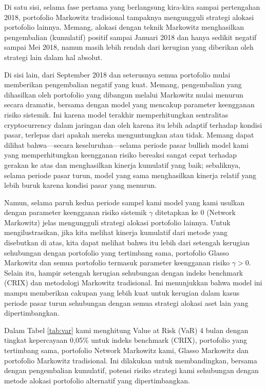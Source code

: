 \documentclass[12pt,a4paper]{article}
\begin{document}
Di satu sisi, selama fase pertama yang berlangsung kira-kira sampai pertengahan 2018, portofolio Markowitz tradisional tampaknya mengungguli strategi alokasi portofolio lainnya. Memang, alokasi dengan teknik Markowitz menghasilkan pengembalian (kumulatif) positif sampai Januari 2018 dan hanya sedikit negatif sampai Mei 2018, namun masih lebih rendah dari kerugian yang diberikan oleh strategi lain dalam hal absolut.

Di sisi lain, dari September 2018 dan seterusnya semua portofolio mulai memberikan pengembalian negatif yang kuat. Memang, pengembalian yang dihasilkan oleh portofolio yang dibangun melalui Markowitz mulai menurun secara dramatis, bersama dengan model yang mencakup parameter keengganan risiko sistemik. Ini karena model terakhir memperhitungkan sentralitas cryptocurrency dalam jaringan dan oleh karena itu lebih adaptif terhadap kondisi pasar, terlepas dari apakah mereka menguntungkan atau tidak. Memang dapat dilihat bahwa—secara keseluruhan—selama periode pasar bullish model kami yang memperhitungkan keengganan risiko bereaksi sangat cepat terhadap gerakan ke atas dan menghasilkan kinerja kumulatif yang baik; sebaliknya, selama periode pasar turun, model yang sama menghasilkan kinerja relatif yang lebih buruk karena kondisi pasar yang menurun.

Namun, selama paruh kedua periode sampel kami model yang kami usulkan dengan parameter keengganan risiko sistemik $\gamma$ ditetapkan ke 0 (Network Markowitz) jelas mengungguli strategi alokasi portofolio lainnya. Untuk mengilustrasikan, jika kita melihat kinerja kumulatif dari metode yang disebutkan di atas, kita dapat melihat bahwa itu lebih dari setengah kerugian sehubungan dengan portofolio yang tertimbang sama, portofolio Glasso Markowitz dan semua portofolio termasuk parameter keengganan risiko $\gamma > 0$. Selain itu, hampir setengah kerugian sehubungan dengan indeks benchmark (CRIX) dan metodologi Markowitz tradisional. Ini menunjukkan bahwa model ini mampu memberikan cakupan yang lebih kuat untuk kerugian dalam kasus periode pasar turun sehubungan dengan semua strategi alokasi aset lain yang dipertimbangkan.

Dalam Tabel \ref{tab:var} kami menghitung Value at Risk (VaR) 4 bulan dengan tingkat kepercayaan 0,05\% untuk indeks benchmark (CRIX), portofolio yang tertimbang sama, portofolio Network Markowitz kami, Glasso Markowitz dan portofolio Markowitz tradisional. Ini dilakukan untuk membandingkan, bersama dengan pengembalian kumulatif, potensi risiko strategi kami sehubungan dengan metode alokasi portofolio alternatif yang dipertimbangkan.
\end{document}
